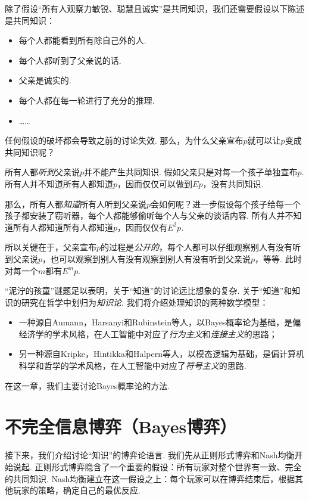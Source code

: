 除了假设“所有人观察力敏锐、聪慧且诚实”是共同知识，我们还需要假设以下陈述是共同知识：
    \begin{itemize}
        \item 每个人都能看到所有除自己外的人.
        \item 每个人都听到了父亲说的话.
        \item 父亲是诚实的.
        \item 每个人都在每一轮进行了充分的推理.
        \item ……
    \end{itemize}
任何假设的破坏都会导致之前的讨论失效. 那么，为什么父亲宣布$p$就可以让$p$变成共同知识呢？

所有人都\textit{听到}父亲说$p$并不能产生共同知识. 假如父亲只是对每一个孩子单独宣布$p$. 所有人并不知道所有人都知道$p$，因而仅仅可以做到$E p$，没有共同知识. 

那么，所有人都\textit{知道}所有人听到父亲说$p$会如何呢？进一步假设每个孩子给每一个孩子都安装了窃听器，每个人都能够偷听每个人与父亲的谈话内容. 所有人并不知道所有人都知道所有人都知道$p$，因而仅仅有$E^2 p$. 

所以关键在于，父亲宣布$p$的过程是\textit{公开的}，每个人都可以仔细观察别人有没有听到父亲说$p$，也可以观察到别人有没有观察到别人有没有听到父亲说$p$，等等. 此时对每一个$m$都有$E^m p$.

“泥泞的孩童”谜题足以表明，关于“知道”的讨论远比想象的复杂. 关于“知道”和知识的研究在哲学中划归为\textit{知识论}. 我们将介绍处理知识的两种数学模型：
\begin{itemize}
    \item 一种源自Aumann，Harsanyi和Rubinstein等人，以Bayes概率论为基础，是偏经济学的学术风格，在人工智能中对应了\textit{行为主义}和\textit{连接主义}的思路；
    \item 另一种源自Kripke，Hintikka和Halpern等人，以模态逻辑为基础，是偏计算机科学和哲学的学术风格，在人工智能中对应了\textit{符号主义}的思路. 
\end{itemize}
在这一章，我们主要讨论Bayes概率论的方法.

\section{不完全信息博弈（Bayes博弈）}

接下来，我们介绍讨论“知识”的博弈论语言. 我们先从正则形式博弈和Nash均衡开始说起. 正则形式博弈隐含了一个重要的假设：所有玩家对整个世界有一致、完全的共同知识. Nash均衡建立在这一假设之上：每个玩家可以在博弈结束后，根据其他玩家的策略，确定自己的最优反应. 

